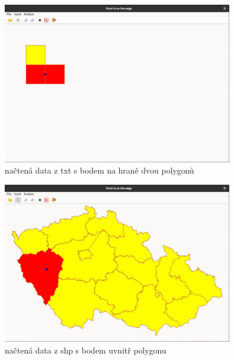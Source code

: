 \begin{figure}[H]
    \centering
    \includegraphics[width=0.9\textwidth]{images/data_txt_edge.JPG}
    \caption{načtená data z txt s bodem na hraně dvou polygonů}
\end{figure}

\begin{figure}[H]
    \centering
    \includegraphics[width=0.9\textwidth]{images/data_shp_inside.JPG}
    \caption{načtená data z shp s bodem uvnitř polygonu}
\end{figure}